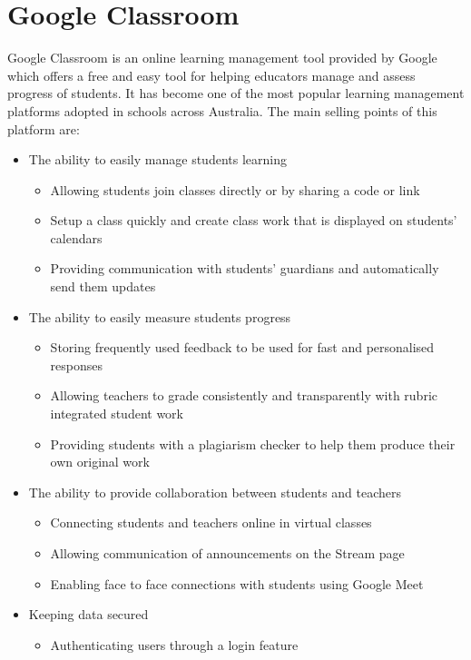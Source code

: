 \section{Google Classroom}
Google Classroom is an online learning management tool provided by Google which offers a free and easy tool for helping educators manage and assess progress of students. It has become one of the most popular learning management platforms adopted in schools across Australia. 
The main selling points of this platform are:
\begin{itemize}
    \item The ability to easily manage students learning
    \begin{itemize}
        \item Allowing students join classes directly or by sharing a code or link 
        \item Setup a class quickly and create class work that is displayed on students’ calendars
        \item Providing communication with students’ guardians and automatically send them updates
    \end{itemize}
    \item The ability to easily measure students progress 
    \begin{itemize}
        \item Storing frequently used feedback to be used for fast and personalised responses
        \item Allowing teachers to grade consistently and transparently with rubric integrated student work
        \item Providing students with a plagiarism checker to help them produce their own original work
    \end{itemize}
    \item The ability to provide collaboration between students and teachers 
    \begin{itemize}
        \item Connecting students and teachers online in virtual classes
        \item Allowing communication of announcements on the Stream page
        \item Enabling face to face connections with students using Google Meet
    \end{itemize}
    \item Keeping data secured 
    \begin{itemize}
        \item Authenticating users through a login feature

\end{itemize}
\end{itemize}
